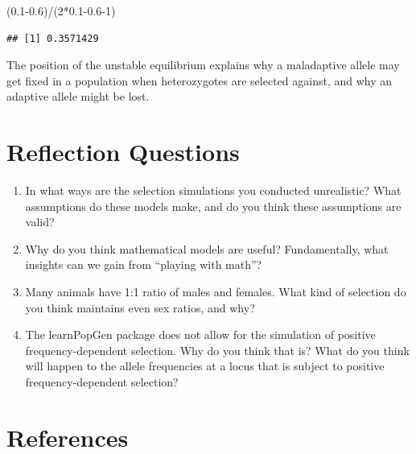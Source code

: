 \documentclass[
]{book}
\newenvironment{Shaded}{\begin{snugshade}}{\end{snugshade}}
\newcommand{\DecValTok}[1]{\textcolor[rgb]{0.00,0.00,0.81}{#1}}
\newcommand{\FloatTok}[1]{\textcolor[rgb]{0.00,0.00,0.81}{#1}}
\newcommand{\NormalTok}[1]{#1}
\newcommand{\SpecialCharTok}[1]{\textcolor[rgb]{0.00,0.00,0.00}{#1}}
\begin{document}
\begin{Shaded}
\begin{Highlighting}[]
\NormalTok{(}\FloatTok{0.1{-}0.6}\NormalTok{)}\SpecialCharTok{/}\NormalTok{(}\DecValTok{2}\SpecialCharTok{*}\FloatTok{0.1{-}0.6}\DecValTok{{-}1}\NormalTok{)}
\end{Highlighting}
\end{Shaded}

\begin{verbatim}
## [1] 0.3571429
\end{verbatim}

The position of the unstable equilibrium explains why a maladaptive allele may get fixed in a population when heterozygotes are selected against, and why an adaptive allele might be lost.\\

\hypertarget{reflection-questions-4}{%
\section{Reflection Questions}\label{reflection-questions-4}}

\begin{enumerate}
\def\labelenumi{\arabic{enumi}.}
\item
  In what ways are the selection simulations you conducted unrealistic? What assumptions do these models make, and do you think these assumptions are valid?
\item
  Why do you think mathematical models are useful? Fundamentally, what insights can we gain from ``playing with math''?
\item
  Many animals have 1:1 ratio of males and females. What kind of selection do you think maintains even sex ratios, and why?
\item
  The learnPopGen package does not allow for the simulation of positive frequency-dependent selection. Why do you think that is? What do you think will happen to the allele frequencies at a locus that is subject to positive frequency-dependent selection?
\end{enumerate}

\hypertarget{references-5}{%
\section{References}\label{references-5}}
\end{document}
